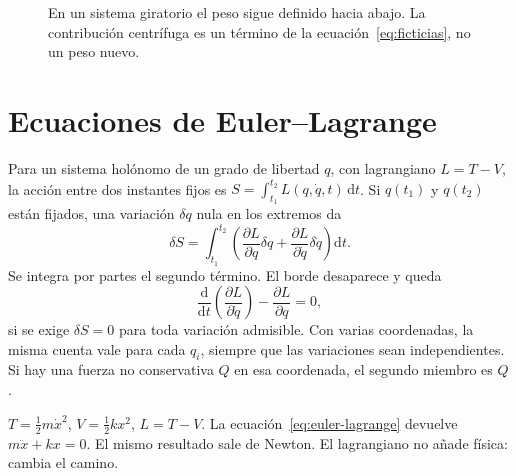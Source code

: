 \begin{figure}[ht]
\centering
{}
\caption{En un sistema giratorio el peso sigue definido hacia abajo. La contribución centrífuga es un término de la ecuación~\eqref{eq:ficticias}, no un peso nuevo.}
\label{fig:no-inercial}
\end{figure}

\section{Ecuaciones de Euler--Lagrange}

Para un sistema holónomo de un grado de libertad \(q\), con lagrangiano \(L=T-V\), la acción entre dos instantes fijos es \(S=\int_{t_1}^{t_2} L(q,\dot q,t)\,\mathrm{d}t\). Si \(q(t_1)\) y \(q(t_2)\) están fijados, una variación \(\delta q\) nula en los extremos da
\[
\delta S=\int_{t_1}^{t_2}\left(\frac{\partial L}{\partial q}\delta q+\frac{\partial L}{\partial \dot q}\delta\dot q\right)\mathrm{d}t.
\]
Se integra por partes el segundo término. El borde desaparece y queda
\begin{equation}
\label{eq:euler-lagrange}
\frac{\mathrm{d}}{\mathrm{d}t}\left(\frac{\partial L}{\partial \dot q}\right)-\frac{\partial L}{\partial q}=0,
\end{equation}
si se exige \(\delta S=0\) para toda variación admisible. Con varias coordenadas, la misma cuenta vale para cada \(q_i\), siempre que las variaciones sean independientes. Si hay una fuerza no conservativa \(Q\) en esa coordenada, el segundo miembro es \(Q\).

\begin{examplebox}
\(T=\tfrac12 m\dot x^2\), \(V=\tfrac12 kx^2\), \(L=T-V\). La ecuación~\eqref{eq:euler-lagrange} devuelve \(m\ddot x+kx=0\). El mismo resultado sale de Newton. El lagrangiano no añade física: cambia el camino.
\end{examplebox}

